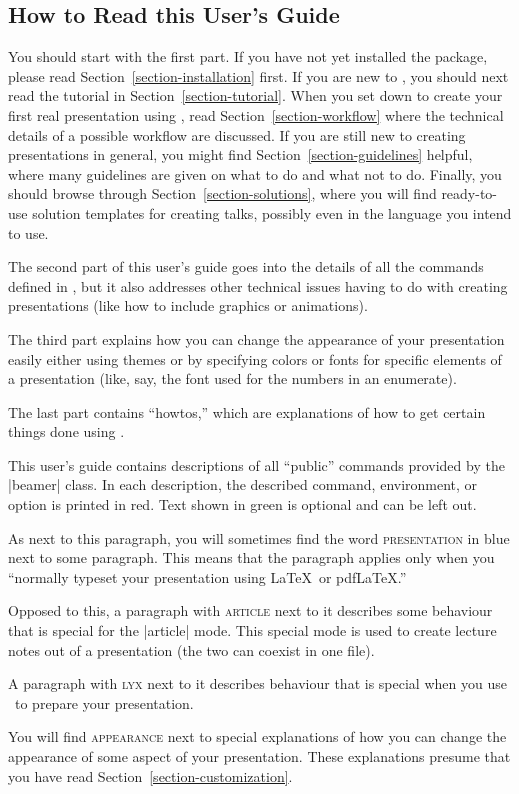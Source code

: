 \subsection{How to Read this User's Guide}

You should start with the first part. If you have not yet installed
the package, please read Section~\ref{section-installation} first. If 
you are new to \beamer, you should next read the tutorial in
Section~\ref{section-tutorial}. When you set down to create your first
real presentation using \beamer, read Section~\ref{section-workflow}
where the technical details of a possible workflow are
discussed. If you are still new to creating presentations in general, you
might find Section~\ref{section-guidelines} helpful, where many
guidelines are given on what to do and what not to do. Finally, you
should browse through Section~\ref{section-solutions}, where you will
find ready-to-use solution templates for creating talks, possibly even
in the language you intend to use.

The second part of this user's guide goes into the details of all the
commands defined in \beamer, but it also addresses  other technical
issues having to do with creating presentations (like how to include
graphics or animations).

The third part explains how you can change the appearance of your
presentation easily either using themes or by specifying colors or
fonts for specific elements of a presentation (like, say, the font
used for the numbers in an enumerate). 

The last part contains ``howtos,'' which are explanations of how to
get certain things done using \beamer.

\medskip
\noindent
This user's guide contains descriptions of all ``public''
commands provided by the |beamer| class. In each description, the
described command, environment, or option is printed in red. Text
shown in green is optional and can be left out.

\beamernote
As next to this paragraph, you will sometimes find the word
\textsc{presentation} in blue next to some paragraph. This means that
the paragraph applies only when you ``normally typeset your
presentation using \LaTeX\ or pdf\LaTeX.''

\articlenote
Opposed to this, a paragraph with \textsc{article} next to it
describes some behaviour that is special for the |article| mode. This
special mode is used to create lecture notes out of a presentation
(the two can coexist in one file).

\lyxnote
A paragraph with \textsc{lyx} next to it describes behaviour that is
special when you use \LyX\ to prepare your presentation.

\appearancenote
You will find \textsc{appearance} next to special explanations of how
you can change the appearance of some aspect of your
presentation. These explanations presume that you have read
Section~\ref{section-customization}.



